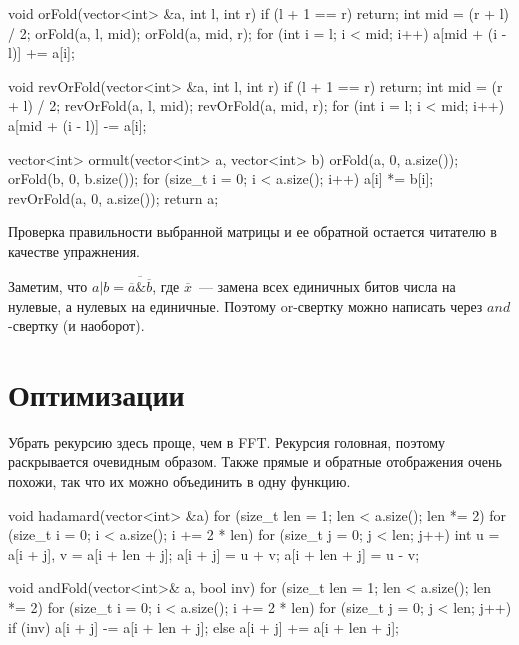 \begin{code}
    
void orFold(vector<int> &a, int l, int r) {
    if (l + 1 == r) {
        return;
    }
    int mid = (r + l) / 2;
    orFold(a, l, mid);
    orFold(a, mid, r);
    for (int i = l; i < mid; i++) {
        a[mid + (i - l)] += a[i];
    }
}

void revOrFold(vector<int> &a, int l, int r) {
    if (l + 1 == r) {
        return;
    }
    int mid = (r + l) / 2;
    revOrFold(a, l, mid);
    revOrFold(a, mid, r);
    for (int i = l; i < mid; i++) {
        a[mid + (i - l)] -= a[i];
    }
}

vector<int> ormult(vector<int> a, vector<int> b) {
    orFold(a, 0, a.size());
    orFold(b, 0, b.size());
    for (size_t i = 0; i < a.size(); i++) {
        a[i] *= b[i];
    }
    revOrFold(a, 0, a.size());
    return a;
}

\end{code}



Проверка правильности выбранной матрицы и ее обратной остается читателю в качестве упражнения.

\begin{observation}
\label{adamar: orand}
    Заметим, что $a | b = \overline{\overline{a} \& \overline{b}}$, где $\overline{x}$~--- замена всех единичных битов числа
    на нулевые, а нулевых на единичные. Поэтому or-свертку можно написать через $and$-свертку (и наоборот).
\end{observation}


\section{Оптимизации}

Убрать рекурсию здесь проще, чем в FFT. Рекурсия головная, поэтому раскрывается очевидным образом.
Также прямые и обратные отображения очень похожи, так что их можно объединить в одну функцию.

\begin{code}
void hadamard(vector<int> &a) {
    for (size_t len = 1; len < a.size(); len *= 2) {
        for (size_t i = 0; i < a.size(); i += 2 * len) {
            for (size_t j = 0; j < len; j++) {
                int u = a[i + j], v = a[i + len + j];
                a[i + j] = u + v;
                a[i + len + j] = u - v;
            }
        }
    }
}
\end{code}

\begin{code}
void andFold(vector<int>& a, bool inv) {
    for (size_t len = 1; len < a.size(); len *= 2) {
        for (size_t i = 0; i < a.size(); i += 2 * len) {
            for (size_t j = 0; j < len; j++) {
                if (inv) {
                    a[i + j] -= a[i + len + j];
                } else {
                    a[i + j] += a[i + len + j];
                }
            }
        }
    }
}
\end{code}

